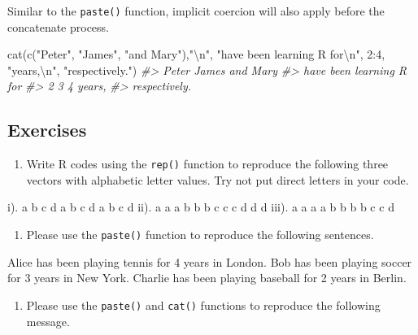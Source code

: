 \documentclass[
]{book}
\newenvironment{Shaded}{\begin{snugshade}}{\end{snugshade}}
\newcommand{\CommentTok}[1]{\textcolor[rgb]{0.56,0.35,0.01}{\textit{#1}}}
\newcommand{\DecValTok}[1]{\textcolor[rgb]{0.00,0.00,0.81}{#1}}
\newcommand{\FunctionTok}[1]{\textcolor[rgb]{0.00,0.00,0.00}{#1}}
\newcommand{\NormalTok}[1]{#1}
\newcommand{\SpecialCharTok}[1]{\textcolor[rgb]{0.00,0.00,0.00}{#1}}
\newcommand{\StringTok}[1]{\textcolor[rgb]{0.31,0.60,0.02}{#1}}
\providecommand{\tightlist}{%
  \setlength{\itemsep}{0pt}\setlength{\parskip}{0pt}}
\begin{document}
Similar to the \texttt{paste()} function, implicit coercion will also apply before the concatenate process.

\begin{Shaded}
\begin{Highlighting}[]
\FunctionTok{cat}\NormalTok{(}\FunctionTok{c}\NormalTok{(}\StringTok{"Peter"}\NormalTok{, }\StringTok{"James"}\NormalTok{, }\StringTok{"and Mary"}\NormalTok{),}\StringTok{"}\SpecialCharTok{\textbackslash{}n}\StringTok{"}\NormalTok{, }
    \StringTok{"have been learning R for}\SpecialCharTok{\textbackslash{}n}\StringTok{"}\NormalTok{, }\DecValTok{2}\SpecialCharTok{:}\DecValTok{4}\NormalTok{, }\StringTok{"years,}\SpecialCharTok{\textbackslash{}n}\StringTok{"}\NormalTok{,}
    \StringTok{"respectively."}\NormalTok{)}
\CommentTok{\#\textgreater{} Peter James and Mary }
\CommentTok{\#\textgreater{}  have been learning R for}
\CommentTok{\#\textgreater{}  2 3 4 years,}
\CommentTok{\#\textgreater{}  respectively.}
\end{Highlighting}
\end{Shaded}

\hypertarget{exercises-11}{%
\subsection{Exercises}\label{exercises-11}}

\begin{enumerate}
\def\labelenumi{\arabic{enumi}.}
\tightlist
\item
  Write R codes using the \texttt{rep()} function to reproduce the following three vectors with alphabetic letter values. Try not put direct letters in your code.
\end{enumerate}

i). a b c d a b c d a b c d
ii). a a a b b b c c c d d d
iii). a a a a b b b b c c d

\begin{enumerate}
\def\labelenumi{\arabic{enumi}.}
\setcounter{enumi}{1}
\tightlist
\item
  Please use the \texttt{paste()} function to reproduce the following sentences.
\end{enumerate}

Alice has been playing tennis for 4 years in London.
Bob has been playing soccer for 3 years in New York.
Charlie has been playing baseball for 2 years in Berlin.

\begin{enumerate}
\def\labelenumi{\arabic{enumi}.}
\setcounter{enumi}{2}
\tightlist
\item
  Please use the \texttt{paste()} and \texttt{cat()} functions to reproduce the following message.
\end{enumerate}
\end{document}
